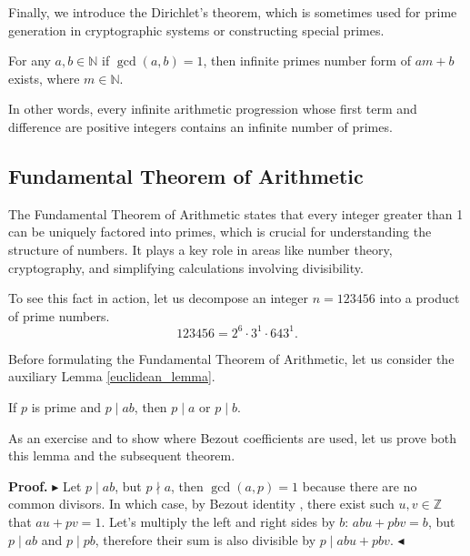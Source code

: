 \documentclass[../lecture-notes-148x210.tex]{subfiles}
\begin{document}
Finally, we introduce the Dirichlet's theorem, which is sometimes used for 
prime generation in cryptographic systems or constructing special primes.

\begin{theorem} 
    For any $a, b \in \mathbb{N}$ if $\gcd(a, b) = 1$, then infinite primes number form of $am + b$ exists, where $m \in \mathbb{N}$.
\end{theorem}

In other words, every infinite arithmetic progression whose first term and difference are positive integers contains an infinite number of primes.

\subsection{Fundamental Theorem of Arithmetic}
The Fundamental Theorem of Arithmetic states that every integer greater than 1 can be 
uniquely factored into primes, which is crucial for understanding the structure of numbers. 
It plays a key role in areas like number theory, cryptography, and simplifying 
calculations involving divisibility. 

\begin{example}
    To see this fact in action, let us decompose an integer $n = 123456$ into a product of prime numbers.
    \begin{equation*}
        123456 = 2^6 \cdot 3^1 \cdot 643^1.
    \end{equation*}
\end{example}

Before formulating the Fundamental Theorem of Arithmetic, let us consider the auxiliary Lemma \ref{euclidean_lemma}.

\begin{lemma}[Euclidean] \label{euclidean_lemma}
    If $p$ is prime and $p \mid ab$, then $p \mid a$ or $p \mid b$.
\end{lemma}

As an exercise and to show where Bezout coefficients are used, let us prove both this lemma and the subsequent theorem.

\textbf{Proof.} 
$\blacktriangleright$
Let $p \mid ab$, but $ p \nmid a$, then $\gcd(a, p) = 1$ because there are no common divisors.
In which case, by Bezout identity , there exist such $u, v \in \mathbb{Z}$ that $au + pv = 1$.
Let's multiply the left and right sides by $b$: $abu + pbv = b$, but $p \mid ab$ and $p \mid pb$, therefore their sum is also divisible by $p \mid abu + pbv$. 
$\blacktriangleleft$
\end{document}
